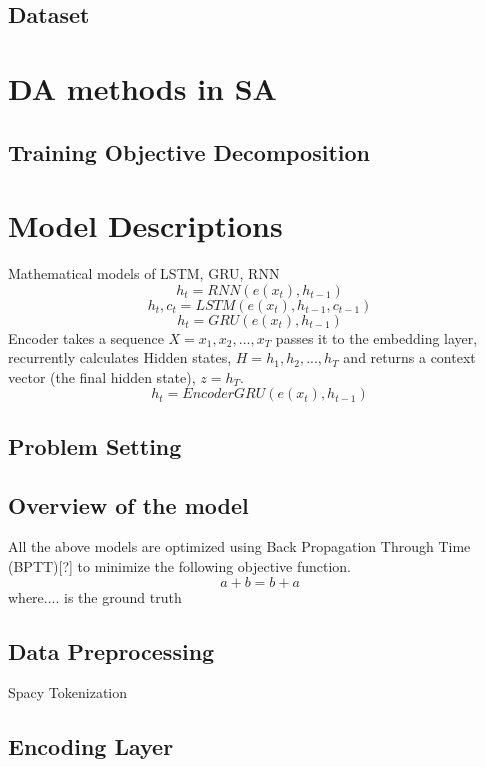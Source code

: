 \documentclass{article}
\begin{document}
\subsection{Dataset}

\section{DA methods in SA}
\subsection{Training Objective Decomposition}
\section{Model Descriptions}
Mathematical models of LSTM, GRU, RNN
\begin{equation}
h_t = RNN(e(x_t), h_{t-1}) 
\end{equation}
\begin{equation}
h_t, c_t = LSTM(e(x_t), h_{t-1}, c_{t-1})
\end{equation}
\begin{equation}
h_t = GRU(e(x_t), h_{t-1})
\end{equation}
Encoder takes a sequence $X = {x_1, x_2, . . ., x_T}$ passes it to the embedding layer, recurrently calculates Hidden states, $H = {h_1, h_2, . . ., h_T}$ and returns a context vector (the final hidden state), $z = h_T$.
\begin{equation}
h_t = EncoderGRU(e(x_t), h_{t-1})
\end{equation}
\subsection{Problem Setting}
\subsection{Overview of the model}
All the above models are optimized using Back Propagation Through Time (BPTT)[?] to minimize the following objective function.
\begin{equation}
a + b = b +a
\end{equation}
where.... is the ground truth
\subsection{Data Preprocessing}
Spacy Tokenization \cite{srinivasa2018natural}
\subsection{Encoding Layer}
\end{document}
